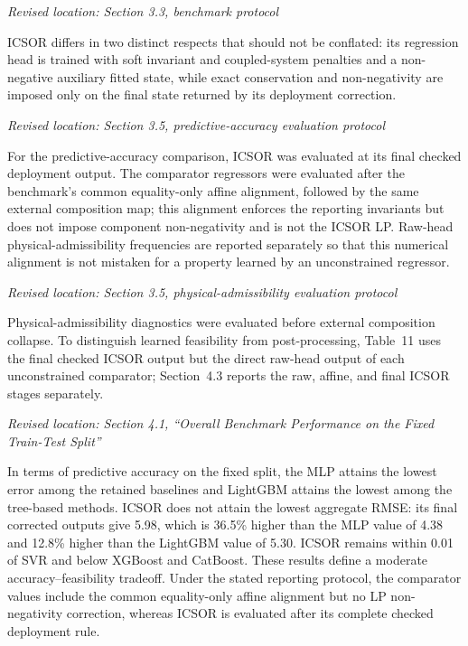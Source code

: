 \documentclass[11pt,a4paper]{article}
\newcommand{\excerptlocation}[1]{\par\noindent\textit{Revised location: #1}\par}
\begin{document}
\excerptlocation{Section 3.3, benchmark protocol}
\begin{revisionexcerpt}
ICSOR differs in two distinct respects that should not be conflated: its regression head is trained with soft invariant and coupled-system penalties and a non-negative auxiliary fitted state, while exact conservation and non-negativity are imposed only on the final state returned by its deployment correction.
\end{revisionexcerpt}

\excerptlocation{Section 3.5, predictive-accuracy evaluation protocol}
\begin{revisionexcerpt}
For the predictive-accuracy comparison, ICSOR was evaluated at its final checked deployment output. The comparator regressors were evaluated after the benchmark's common equality-only affine alignment, followed by the same external composition map; this alignment enforces the reporting invariants but does not impose component non-negativity and is not the ICSOR LP. Raw-head physical-admissibility frequencies are reported separately so that this numerical alignment is not mistaken for a property learned by an unconstrained regressor.
\end{revisionexcerpt}

\excerptlocation{Section 3.5, physical-admissibility evaluation protocol}
\begin{revisionexcerpt}
Physical-admissibility diagnostics were evaluated before external composition collapse. To distinguish learned feasibility from post-processing, Table~11 uses the final checked ICSOR output but the direct raw-head output of each unconstrained comparator; Section~4.3 reports the raw, affine, and final ICSOR stages separately.
\end{revisionexcerpt}

\excerptlocation{Section 4.1, ``Overall Benchmark Performance on the Fixed Train-Test Split''}
\begin{revisionexcerpt}
In terms of predictive accuracy on the fixed split, the MLP attains the lowest error among the retained baselines and LightGBM attains the lowest among the tree-based methods. ICSOR does not attain the lowest aggregate RMSE: its final corrected outputs give 5.98, which is 36.5\% higher than the MLP value of 4.38 and 12.8\% higher than the LightGBM value of 5.30. ICSOR remains within 0.01 of SVR and below XGBoost and CatBoost. These results define a moderate accuracy--feasibility tradeoff. Under the stated reporting protocol, the comparator values include the common equality-only affine alignment but no LP non-negativity correction, whereas ICSOR is evaluated after its complete checked deployment rule.
\end{revisionexcerpt}
\end{document}
